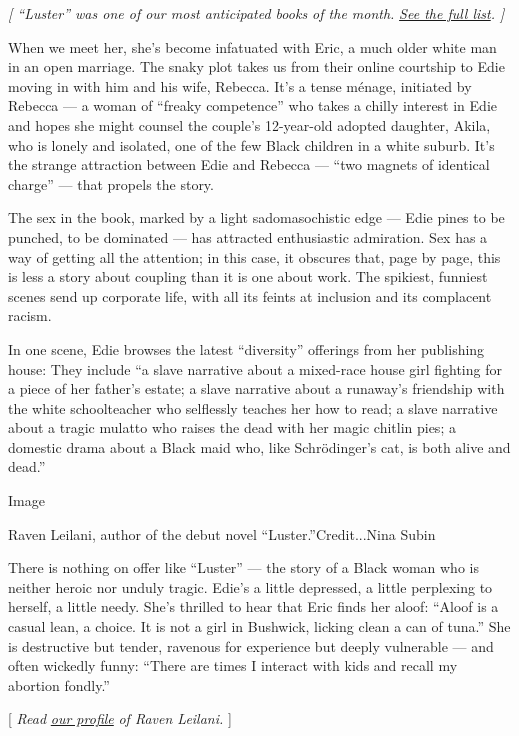 \emph{{[} ``Luster'' was one of our most anticipated books of the
month.}
\href{https://www.nytimes3xbfgragh.onion/2020/07/30/books/new-august-books.html}{\emph{See
the full list}}\emph{. {]}}

When we meet her, she's become infatuated with Eric, a much older white
man in an open marriage. The snaky plot takes us from their online
courtship to Edie moving in with him and his wife, Rebecca. It's a tense
ménage, initiated by Rebecca --- a woman of ``freaky competence'' who
takes a chilly interest in Edie and hopes she might counsel the couple's
12-year-old adopted daughter, Akila, who is lonely and isolated, one of
the few Black children in a white suburb. It's the strange attraction
between Edie and Rebecca --- ``two magnets of identical charge'' ---
that propels the story.

The sex in the book, marked by a light sadomasochistic edge --- Edie
pines to be punched, to be dominated --- has attracted enthusiastic
admiration. Sex has a way of getting all the attention; in this case, it
obscures that, page by page, this is less a story about coupling than it
is one about work. The spikiest, funniest scenes send up corporate life,
with all its feints at inclusion and its complacent racism.

In one scene, Edie browses the latest ``diversity'' offerings from her
publishing house: They include ``a slave narrative about a mixed-race
house girl fighting for a piece of her father's estate; a slave
narrative about a runaway's friendship with the white schoolteacher who
selflessly teaches her how to read; a slave narrative about a tragic
mulatto who raises the dead with her magic chitlin pies; a domestic
drama about a Black maid who, like Schrödinger's cat, is both alive and
dead.''

Image

Raven Leilani, author of the debut novel ``Luster.''Credit...Nina Subin

There is nothing on offer like ``Luster'' --- the story of a Black woman
who is neither heroic nor unduly tragic. Edie's a little depressed, a
little perplexing to herself, a little needy. She's thrilled to hear
that Eric finds her aloof: ``Aloof is a casual lean, a choice. It is not
a girl in Bushwick, licking clean a can of tuna.'' She is destructive
but tender, ravenous for experience but deeply vulnerable --- and often
wickedly funny: ``There are times I interact with kids and recall my
abortion fondly.''

{[} \emph{Read}
\href{https://www.nytimes3xbfgragh.onion/2020/07/31/books/raven-leilani-luster.html}{\emph{our
profile}} \emph{of Raven Leilani.} {]}

